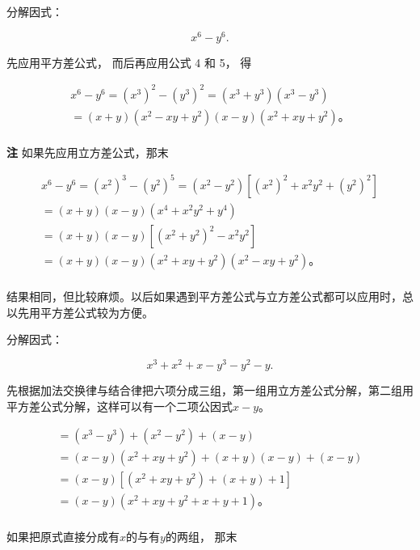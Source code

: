  分解因式：

\[
x ^{6} - y ^{6}.
\]

 先应用平方差公式， 而后再应用公式 4 和 5， 得

\[
\begin{array}{l} x ^{6} - y ^{6} = (x ^{3}) ^{2} - (y ^{3}) ^{2} = (x ^{3} + y ^{3}) (x ^{3} - y ^{3}) \\ = (x + y) \left(x ^{2} - x y + y ^{2}\right) (x - y) \left(x ^{2} + x y + y ^{2}\right)\text{。} \\ \end{array}
\]

\textbf{注} 如果先应用立方差公式，那末

\[
\begin{array}{l} x ^{6} - y ^{6} = (x ^{2}) ^{3} - (y ^{2}) ^{5} = (x ^{2} - y ^{2}) [ (x ^{2}) ^{2} + x ^{2} y ^{2} + (y ^{2}) ^{2} ] \\ = (x + y) (x - y) \left(x ^{4} + x ^{2} y ^{2} + y ^{4}\right) \\ = (x + y) (x - y) \left[ \left(x ^{2} + y ^{2}\right) ^{2} - x ^{2} y ^{2} \right] \\ = (x + y) (x - y) \left(x ^{2} + x y + y ^{2}\right) \left(x ^{2} - x y + y ^{2}\right)\text{。} \\ \end{array}
\]

结果相同，但比较麻烦。以后如果遇到平方差公式与立方差公式都可以应用时，总以先用平方差公式较为方便。

 分解因式：

\[
x ^{3} + x ^{2} + x - y ^{3} - y ^{2} - y.
\]

先根据加法交换律与结合律把六项分成三组，第一组用立方差公式分解，第二组用平方差公式分解，这样可以有一个二项公因式\(x - y\)。

\[
\begin{array}{l} = (x ^{3} - y ^{3}) + (x ^{2} - y ^{2}) + (x - y) \\ = (x - y) \left(x ^{2} + x y + y ^{2}\right) + (x + y) (x - y) + (x - y) \\ = (x - y) \left[ \left(x ^{2} + x y + y ^{2}\right) + (x + y) + 1 \right] \\ = (x - y) \left(x ^{2} + x y + y ^{2} + x + y + 1\right)\text{。} \\ \end{array}
\]

 如果把原式直接分成有\(x\)的与有\(y\)的两组， 那末

